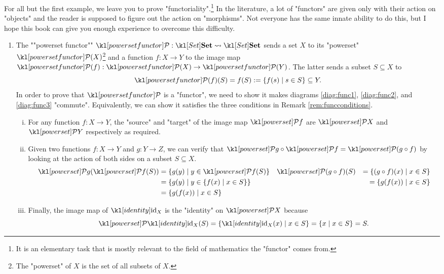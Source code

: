 \documentclass[main.tex]{subfiles}
\begin{document}
\begin{exmps}\label{exmp:functors}
	For all but the first example, we leave you to prove "functoriality".\footnote{It is an elementary task that is mostly relevant to the field of mathematics the "functor" comes from.} In the literature, a lot of "functors" are given only with their action on "objects" and the reader is supposed to figure out the action on "morphisms". Not everyone has the same innate ability to do this, but I hope this book can give you enough experience to overcome this difficulty.
	\begin{enumerate}
		\item The ""powerset functor"" $\mPcov: \catSet \rightsquigarrow \catSet$ sends a set $X$ to its "powerset" $\mPcov(X)$\footnote{The "powerset" of $X$ is the set of all subsets of $X$.} and a function $f: X\rightarrow Y$ to the image map $\mPcov(f):\mPcov(X)\rightarrow \mPcov(Y)$. The latter sends a subset $S\subseteq X$ to \[\mPcov(f)(S)= f(S) := \{f(s) \mid s \in S\} \subseteq Y.\]
		In order to prove that $\mPcov$ is a "functor", we need to show it makes diagrams \eqref{diag:func1}, \eqref{diag:func2}, and \eqref{diag:func3} "commute". Equivalently, we can show it satisfies the three conditions in Remark \ref{rem:funcconditions}.
		
		\begin{enumerate}[i.]
			\item For any function $f: X \rightarrow Y$, the "source" and "target" of the image map $\mP f$ are $\mP X$ and $\mP Y$ respectively as required.
			\item Given two functions $f:X \rightarrow Y$ and $g: Y \rightarrow Z$, we can verify that $\mP g \circ \mP f = \mP(g \circ f)$ by looking at the action of both sides on a subset $S \subseteq X$.
			\begin{align*}
				\mP g(\mP f(S)) &= \{ g(y) \mid y \in \mP f(S)\} && \mP(g \circ f)(S) &= \{(g \circ f)(x) \mid x \in S\}\\
				&= \{g(y) \mid y \in \{ f(x) \mid x \in S\}\} && &= \{g(f(x)) \mid x \in S\}\\
				&= \{g(f(x)) \mid x \in S\}
			\end{align*}
			\item Finally, the image map of $\id_X$ is the "identity" on $\mP X$ because
			\[\mP\id_X(S)= \{\id_X(x) \mid x \in S\} = \{ x \mid x \in S\} = S.\]
		\end{enumerate}


\end{enumerate}
\end{exmps}
\end{document}
